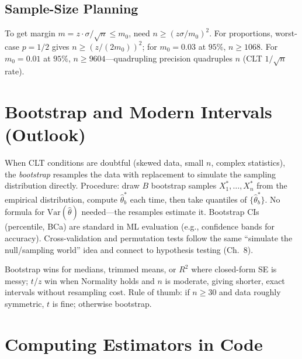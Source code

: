 \subsection{Sample-Size Planning}
To get margin $m=z\cdot\sigma/\sqrt{n}\le m_0$, need $n\ge(z\sigma/m_0)^2$.
For proportions, worst-case $p=1/2$ gives $n\ge(z/(2m_0))^2$;
for $m_0=0.03$ at $95\%$, $n\ge1068$.
For $m_0=0.01$ at $95\%$, $n\ge9604$---quadrupling precision quadruples $n$ (CLT $1/\sqrt{n}$ rate).

\section{Bootstrap and Modern Intervals (Outlook)}
\label{sec:bootstrap}
When CLT conditions are doubtful (skewed data, small $n$, complex statistics), the \emph{bootstrap} resamples the data with replacement to simulate the sampling distribution directly. Procedure: draw $B$ bootstrap samples $X_1^*,\dots,X_n^*$ from the empirical distribution, compute $\hat\theta^*_b$ each time, then take quantiles of $\{\hat\theta^*_b\}$. No formula for $\mathrm{Var}(\hat\theta)$ needed---the resamples estimate it. Bootstrap CIs (percentile, BCa) are standard in ML evaluation (e.g., confidence bands for accuracy). Cross-validation and permutation tests follow the same ``simulate the null/sampling world'' idea and connect to hypothesis testing (Ch.~8).

\begin{remark} Bootstrap wins for medians, trimmed means, or $R^2$ where closed-form SE is messy; $t$/$z$ win when Normality holds and $n$ is moderate, giving shorter, exact intervals without resampling cost. Rule of thumb: if $n\ge30$ and data roughly symmetric, $t$ is fine; otherwise bootstrap.
\end{remark}

\section{Computing Estimators in Code}
\label{sec:code-estimation}

